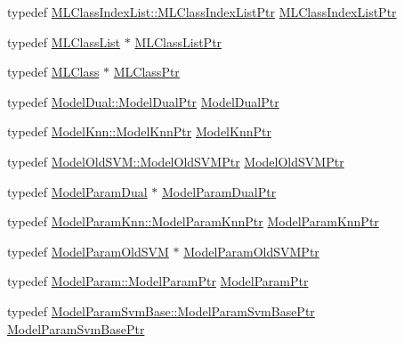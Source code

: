 \begin{DoxyCompactItemize}
\item 
typedef \hyperlink{class_k_k_m_l_l_1_1_m_l_class_index_list_a13e67cfd849602c0ba70ec10043f6b05}{M\+L\+Class\+Index\+List\+::\+M\+L\+Class\+Index\+List\+Ptr} \hyperlink{namespace_k_k_m_l_l_abf6e92f3564941506e939a17bcadfbde}{M\+L\+Class\+Index\+List\+Ptr}
\item 
typedef \hyperlink{class_k_k_m_l_l_1_1_m_l_class_list}{M\+L\+Class\+List} $\ast$ \hyperlink{namespace_k_k_m_l_l_af091cde3f4a4315658b41a5e7583fc26}{M\+L\+Class\+List\+Ptr}
\item 
typedef \hyperlink{class_k_k_m_l_l_1_1_m_l_class}{M\+L\+Class} $\ast$ \hyperlink{namespace_k_k_m_l_l_ac272393853d59e72e8456f14cd6d8c23}{M\+L\+Class\+Ptr}
\item 
typedef \hyperlink{class_k_k_m_l_l_1_1_model_dual_aa5c30e12d0d4eeed91d9fafc858544f4}{Model\+Dual\+::\+Model\+Dual\+Ptr} \hyperlink{namespace_k_k_m_l_l_a77902c7a85875707f89899d491b84971}{Model\+Dual\+Ptr}
\item 
typedef \hyperlink{class_k_k_m_l_l_1_1_model_knn_a1abfb9166a9e53ff6116716105876001}{Model\+Knn\+::\+Model\+Knn\+Ptr} \hyperlink{namespace_k_k_m_l_l_af6bef26247ab1e5e6f2460f22dc5b65e}{Model\+Knn\+Ptr}
\item 
typedef \hyperlink{class_k_k_m_l_l_1_1_model_old_s_v_m_a0ad9d6a95b826532145fd3778a396db4}{Model\+Old\+S\+V\+M\+::\+Model\+Old\+S\+V\+M\+Ptr} \hyperlink{namespace_k_k_m_l_l_ab771fc915ce1e4f2c938a942923ad8b7}{Model\+Old\+S\+V\+M\+Ptr}
\item 
typedef \hyperlink{class_k_k_m_l_l_1_1_model_param_dual}{Model\+Param\+Dual} $\ast$ \hyperlink{namespace_k_k_m_l_l_ac0d00af7c9dc9b90ef0ce1a91ccd1c40}{Model\+Param\+Dual\+Ptr}
\item 
typedef \hyperlink{class_k_k_m_l_l_1_1_model_param_knn_a0cb141b4f25bad4ccd11ac5a62a2cf43}{Model\+Param\+Knn\+::\+Model\+Param\+Knn\+Ptr} \hyperlink{namespace_k_k_m_l_l_a9a43d46912e7043762296efe4f99bac9}{Model\+Param\+Knn\+Ptr}
\item 
typedef \hyperlink{class_k_k_m_l_l_1_1_model_param_old_s_v_m}{Model\+Param\+Old\+S\+VM} $\ast$ \hyperlink{namespace_k_k_m_l_l_a768d5bdb1e76c57162d3abec212326e4}{Model\+Param\+Old\+S\+V\+M\+Ptr}
\item 
typedef \hyperlink{class_k_k_m_l_l_1_1_model_param_a9207769b1dd342da66939ceffa4324cf}{Model\+Param\+::\+Model\+Param\+Ptr} \hyperlink{namespace_k_k_m_l_l_a76c2dec3304f1a2dc2e357872e4fb320}{Model\+Param\+Ptr}
\item 
typedef \hyperlink{class_k_k_m_l_l_1_1_model_param_svm_base_a5ad5361c21775170f41e908b5bf924d0}{Model\+Param\+Svm\+Base\+::\+Model\+Param\+Svm\+Base\+Ptr} \hyperlink{namespace_k_k_m_l_l_a33c6027f2904ad96488db149ac30500c}{Model\+Param\+Svm\+Base\+Ptr}

\end{DoxyCompactItemize}
